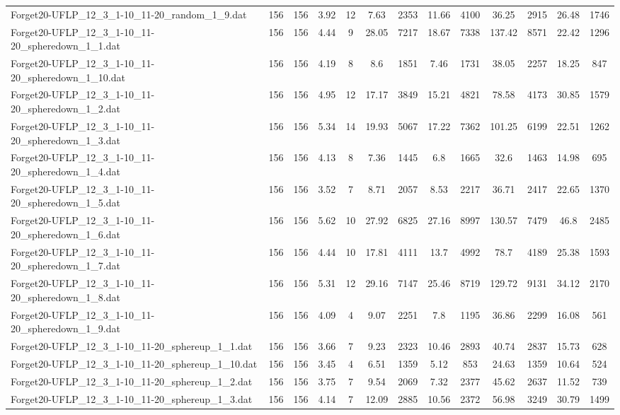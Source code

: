 \begin{table}[!ht]
{\begin{tabular}{lcccccccccccc}
Forget20-UFLP\_12\_3\_1-10\_11-20\_random\_1\_9.dat & 156 & 156 & 3.92 & 12 & 7.63 & 2353 & 11.66 & 4100 & 36.25 & 2915 & 26.48 & 1746 \\
Forget20-UFLP\_12\_3\_1-10\_11-20\_spheredown\_1\_1.dat & 156 & 156 & 4.44 & 9 & 28.05 & 7217 & 18.67 & 7338 & 137.42 & 8571 & 22.42 & 1296 \\
Forget20-UFLP\_12\_3\_1-10\_11-20\_spheredown\_1\_10.dat & 156 & 156 & 4.19 & 8 & 8.6 & 1851 & 7.46 & 1731 & 38.05 & 2257 & 18.25 & 847 \\
Forget20-UFLP\_12\_3\_1-10\_11-20\_spheredown\_1\_2.dat & 156 & 156 & 4.95 & 12 & 17.17 & 3849 & 15.21 & 4821 & 78.58 & 4173 & 30.85 & 1579 \\
Forget20-UFLP\_12\_3\_1-10\_11-20\_spheredown\_1\_3.dat & 156 & 156 & 5.34 & 14 & 19.93 & 5067 & 17.22 & 7362 & 101.25 & 6199 & 22.51 & 1262 \\
Forget20-UFLP\_12\_3\_1-10\_11-20\_spheredown\_1\_4.dat & 156 & 156 & 4.13 & 8 & 7.36 & 1445 & 6.8 & 1665 & 32.6 & 1463 & 14.98 & 695 \\
Forget20-UFLP\_12\_3\_1-10\_11-20\_spheredown\_1\_5.dat & 156 & 156 & 3.52 & 7 & 8.71 & 2057 & 8.53 & 2217 & 36.71 & 2417 & 22.65 & 1370 \\
Forget20-UFLP\_12\_3\_1-10\_11-20\_spheredown\_1\_6.dat & 156 & 156 & 5.62 & 10 & 27.92 & 6825 & 27.16 & 8997 & 130.57 & 7479 & 46.8 & 2485 \\
Forget20-UFLP\_12\_3\_1-10\_11-20\_spheredown\_1\_7.dat & 156 & 156 & 4.44 & 10 & 17.81 & 4111 & 13.7 & 4992 & 78.7 & 4189 & 25.38 & 1593 \\
Forget20-UFLP\_12\_3\_1-10\_11-20\_spheredown\_1\_8.dat & 156 & 156 & 5.31 & 12 & 29.16 & 7147 & 25.46 & 8719 & 129.72 & 9131 & 34.12 & 2170 \\
Forget20-UFLP\_12\_3\_1-10\_11-20\_spheredown\_1\_9.dat & 156 & 156 & 4.09 & 4 & 9.07 & 2251 & 7.8 & 1195 & 36.86 & 2299 & 16.08 & 561 \\
Forget20-UFLP\_12\_3\_1-10\_11-20\_sphereup\_1\_1.dat & 156 & 156 & 3.66 & 7 & 9.23 & 2323 & 10.46 & 2893 & 40.74 & 2837 & 15.73 & 628 \\
Forget20-UFLP\_12\_3\_1-10\_11-20\_sphereup\_1\_10.dat & 156 & 156 & 3.45 & 4 & 6.51 & 1359 & 5.12 & 853 & 24.63 & 1359 & 10.64 & 524 \\
Forget20-UFLP\_12\_3\_1-10\_11-20\_sphereup\_1\_2.dat & 156 & 156 & 3.75 & 7 & 9.54 & 2069 & 7.32 & 2377 & 45.62 & 2637 & 11.52 & 739 \\
Forget20-UFLP\_12\_3\_1-10\_11-20\_sphereup\_1\_3.dat & 156 & 156 & 4.14 & 7 & 12.09 & 2885 & 10.56 & 2372 & 56.98 & 3249 & 30.79 & 1499 \\

\end{tabular}}
\end{table}
